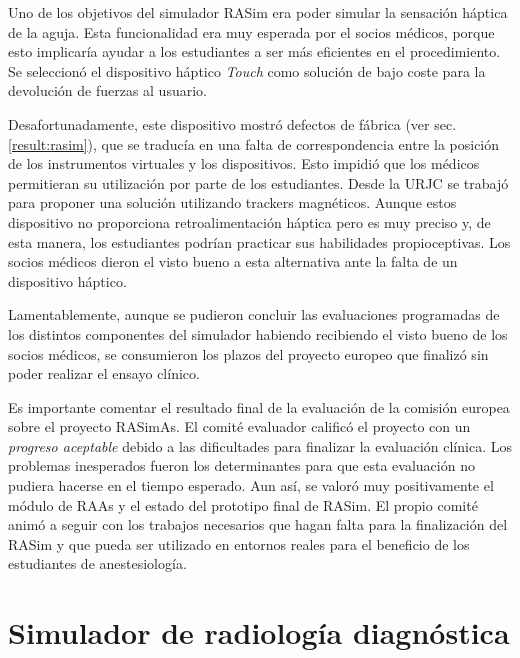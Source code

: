 Uno de los objetivos del simulador \ac{RASim} era poder simular la sensación háptica de la aguja. Esta funcionalidad era muy esperada por el socios médicos, porque esto implicaría ayudar a los estudiantes a ser más eficientes en el procedimiento. Se seleccionó el dispositivo háptico \emph{Touch} como solución de bajo coste para la devolución de fuerzas al usuario.  

Desafortunadamente, este dispositivo mostró defectos de fábrica (ver sec. \ref{result:rasim}), que se traducía en una falta de correspondencia entre la posición de los instrumentos virtuales y los dispositivos. Esto impidió que los médicos permitieran su utilización por parte de los estudiantes.  
%
Desde la \ac{URJC} se trabajó para proponer una solución utilizando \acs{tracker}s magnéticos. Aunque estos dispositivo no proporciona retroalimentación háptica pero es muy preciso y, de esta manera, los estudiantes podrían practicar sus habilidades propioceptivas. Los socios médicos dieron el visto bueno a esta alternativa ante la falta de un dispositivo háptico. 

Lamentablemente, aunque se pudieron concluir las evaluaciones programadas de los distintos componentes del simulador habiendo recibiendo el visto bueno de los socios médicos, se consumieron los plazos del proyecto europeo que finalizó sin poder realizar el ensayo clínico.%


Es importante comentar el resultado final de la evaluación de la comisión europea sobre el proyecto \ac{RASimAs}. El comité evaluador calificó el proyecto con un \emph{progreso aceptable} debido a las dificultades para finalizar la evaluación clínica. Los problemas inesperados fueron los determinantes para que esta evaluación no pudiera hacerse en el tiempo esperado. Aun así, se valoró muy positivamente el módulo de \ac{RAAs} y el estado del prototipo final de \ac{RASim}. El propio comité animó a seguir con los trabajos necesarios que hagan falta para la finalización del \ac{RASim} y que pueda ser utilizado en entornos reales para el beneficio de los estudiantes de anestesiología.


\section{Simulador de radiología diagnóstica }
\label{conclu:xray}


